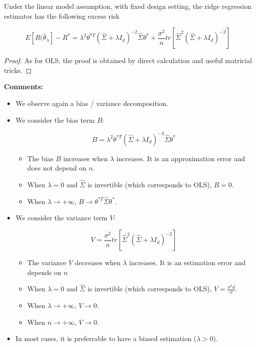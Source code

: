 \documentclass[
10pt, %
a4paper, %
oneside, %
headinclude,footinclude, %
BCOR5mm, %
]{scrartcl}
\begin{document}
\begin{proposition}
    
    Under the linear model assumption, with fixed design setting, the ridge regression estimator has the following excess risk

    \begin{equation}
	E[ R( \hat{\theta}_{\lambda}]-R^* = \lambda^2\theta^{*T} ( \hat{\Sigma}+\lambda I_d)^{-2} \hat{\Sigma} \theta^*+ \frac{\sigma^2}{n} tr[ \hat{\Sigma}^2( \hat{\Sigma}+\lambda I_d)^{-2} ]
    \end{equation}
\end{proposition}

\begin{proof}
As for OLS, the proof is obtained by direct calculation and useful matricial tricks.
\end{proof}


\textbf{{Comments:}} 
\begin{itemize}
    \item We observe again a bias / variance decomposition.
    \item We consider the bias term $B$:

        \begin{equation}
           B =  \lambda^2\theta^{*T} ( \hat{\Sigma}+\lambda I_d)^{-2} \hat{\Sigma} \theta^*
        \end{equation}
        \begin{itemize}
            \item The bias $B$ increases when $\lambda$ increases. It is an approximation error and does not depend on $n$.
            \item When $\lambda = 0$ and $ \hat{\Sigma}$ is invertible (which corresponds to OLS), $B=0$. 
            \item When $\lambda \rightarrow +\infty$, $B\rightarrow \theta^{*T} \hat{\Sigma}\theta^*$. 
        \end{itemize}

    \item We consider the variance term $V$:

        \begin{equation}
            V=\frac{\sigma^2}{n} tr[ \hat{\Sigma}^2( \hat{\Sigma}+\lambda I_d)^{-2} ]
        \end{equation}
        \begin{itemize}
            \item The variance $V$ decreases when $\lambda$ increases. It is an estimation error and depends on $n$
            \item When $\lambda = 0$ and $ \hat{\Sigma}$ is invertible (which corresponds to OLS), $V= \frac{\sigma^2d}{n} $.
            \item When $\lambda\rightarrow +\infty$, $V\rightarrow 0$. 
            \item When $n\rightarrow +\infty$, $V\rightarrow 0$. 
        \end{itemize}

    \item In most cases, it is preferrable to have a biased estimation ($\lambda >0$).
\end{itemize}
\end{document}
